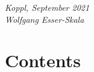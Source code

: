 \documentclass[parskip=full]{scrreprt}
\newif\iftemplate\templatetrue
\begin{document}
\bigskip
\textit{Koppl, September 2021\\
Wolfgang Esser-Skala}

\cleardoublepage
\chapter*{Contents}


\cleardoublepage
\fi

\iftemplate

\fi
\end{document}

